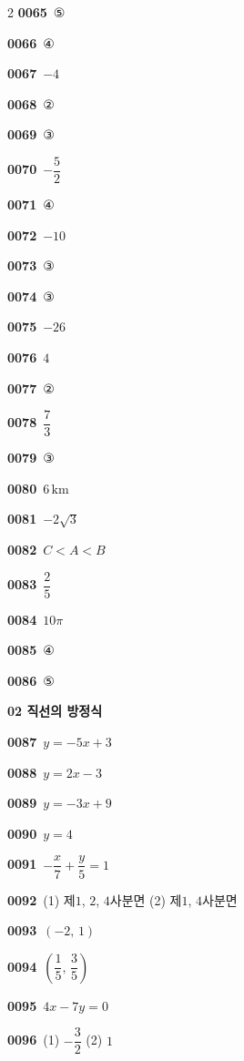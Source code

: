 \documentclass[10pt,a4paper]{article}
\begin{document}
\begin{multicols}{2}
\noindent\textbf{0065}\ ⑤\par
\noindent\textbf{0066}\ ④\par
\noindent\textbf{0067}\ $-4$\par
\noindent\textbf{0068}\ ②\par
\noindent\textbf{0069}\ ③\par
\noindent\textbf{0070}\ $-\dfrac{5}{2}$\par
\noindent\textbf{0071}\ ④\par
\noindent\textbf{0072}\ $-10$\par
\noindent\textbf{0073}\ ③\par
\noindent\textbf{0074}\ ③\par
\noindent\textbf{0075}\ $-26$\par
\noindent\textbf{0076}\ $4$\par
\noindent\textbf{0077}\ ②\par
\noindent\textbf{0078}\ $\dfrac{7}{3}$\par
\noindent\textbf{0079}\ ③\par
\noindent\textbf{0080}\ $6\,\mathrm{km}$\par
\noindent\textbf{0081}\ $-2\sqrt{3}$\par
\noindent\textbf{0082}\ $C<A<B$\par
\noindent\textbf{0083}\ $\dfrac{2}{5}$\par
\noindent\textbf{0084}\ $10\pi$\par
\noindent\textbf{0085}\ ④\par
\noindent\textbf{0086}\ ⑤\par
\noindent\textbf{02 직선의 방정식}\par\smallskip
\noindent\textbf{0087}\ $y=-5x+3$\par
\noindent\textbf{0088}\ $y=2x-3$\par
\noindent\textbf{0089}\ $y=-3x+9$\par
\noindent\textbf{0090}\ $y=4$\par
\noindent\textbf{0091}\ $-\dfrac{x}{7}+\dfrac{y}{5}=1$\par
\noindent\textbf{0092}\ (1) 제$1$, $2$, $4$사분면 (2) 제$1$, $4$사분면\par
\noindent\textbf{0093}\ $(-2,\,1)$\par
\noindent\textbf{0094}\ $\left(\dfrac{1}{5},\,\dfrac{3}{5}\right)$\par
\noindent\textbf{0095}\ $4x-7y=0$\par
\noindent\textbf{0096}\ (1) $-\dfrac{3}{2}$ (2) $1$\par

\end{multicols}
\end{document}
